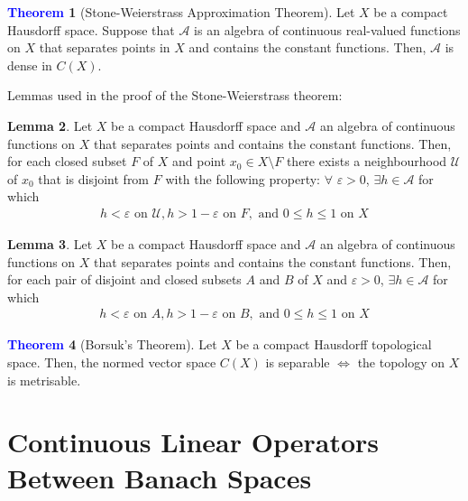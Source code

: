 \documentclass[11pt]{article}
\newcommand{\hood}[0]{\mathcal{U}}
\theoremstyle{definition}
\theoremstyle{definition}
\newtheorem{theorem}{\textcolor{blue}{Theorem}}
\newtheorem{lemma}[theorem]{Lemma}
\theoremstyle{definition}
\theoremstyle{remark}
\begin{document}
\begin{theorem}[Stone-Weierstrass Approximation Theorem]
	Let $X$ be a compact Hausdorff space. Suppose that $\mathcal{A}$ is an algebra of continuous real-valued functions on $X$ that separates points in $X$ and contains the constant functions. Then, $\mathcal{A}$ is dense in $C(X)$. 
\end{theorem}
Lemmas used in the proof of the Stone-Weierstrass theorem: 
\begin{lemma}
	Let $X$ be a compact Hausdorff space and $\mathcal{A}$ an algebra of continuous functions on $X$ that separates points and contains the constant functions. Then, for each closed subset $F$ of $X$ and point $x_0 \in X \setminus F$ there exists a neighbourhood $\hood$ of $x_0$ that is disjoint from $F$ with the following property: $\forall$ $\varepsilon >0$, $\exists h \in \mathcal{A}$ for which
	\begin{align}
		h < \varepsilon \text{ on } \hood, h > 1 - \varepsilon \text{ on } F, \text{ and } 0 \leq h \leq 1 \text{ on } X 	
	\end{align}
\end{lemma}

\begin{lemma}
	Let $X$ be a compact Hausdorff space and $\mathcal{A}$ an algebra of continuous functions on $X$ that separates points and contains the constant functions. Then, for each pair of disjoint and closed subsets $A$ and $B$ of $X$ and $\varepsilon > 0$, $\exists h \in \mathcal{A}$ for which 
	\begin{align}
		h < \varepsilon \text{ on } A, h > 1 - \varepsilon \text{ on } B, \text{ and } 0 \leq h \leq 1 \text{ on } X 	
	\end{align}
\end{lemma}

\begin{theorem}[Borsuk's Theorem]
	Let $X$ be a compact Hausdorff topological space. Then, the normed vector space $C(X)$ is separable $\iff$ the topology on $X$ is metrisable. 
\end{theorem}

\section{Continuous Linear Operators Between Banach Spaces}
\end{document}
